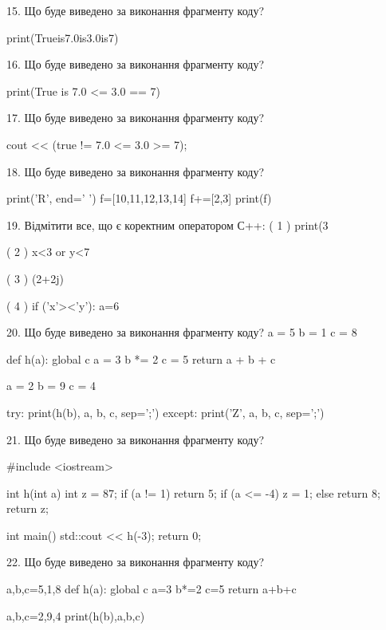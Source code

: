 \documentclass[11pt]{article}
\begin{document}
15. Що буде виведено за виконання фрагменту коду?

print(Trueis7.0is3.0is7)


16. Що буде виведено за виконання фрагменту коду?

print(True is 7.0 <= 3.0 == 7)


17. Що буде виведено за виконання фрагменту коду?

cout << (true != 7.0 <= 3.0 >= 7);


18. Що буде виведено за виконання фрагменту коду?

print('R', end=' ')
f=[10,11,12,13,14]
f+=[2,3]
print(f)



19. %
Відмітити все, що є коректним оператором С++:
( 1 ) print(3%

( 2 ) x<3 or y<7

( 3 ) (2+2j)%

( 4 ) if ('x'><'y'): a=6


20. Що буде виведено за виконання фрагменту коду?
a = 5
b = 1
c = 8

def h(a):
global c    a = 3
    b *= 2
    c = 5
    return a + b + c

a = 2
b = 9
c = 4

try:
    print(h(b), a, b, c, sep=';')
except:
    print('Z', a, b, c, sep=';')


21. Що буде виведено за виконання фрагменту коду?

#include <iostream>

int h(int a){
    int z = 87;
    if (a != 1) 
        return 5;
    if (a <= -4)
         z = 1;
    else
         return 8;
    return z;
}

int main(){
    std::cout << h(-3);
    return 0;
}



22. Що буде виведено за виконання фрагменту коду?

a,b,c=5,1,8
def h(a):
global c    a=3
    b*=2
    c=5
    return a+b+c

a,b,c=2,9,4
print(h(b),a,b,c)
\end{document}
